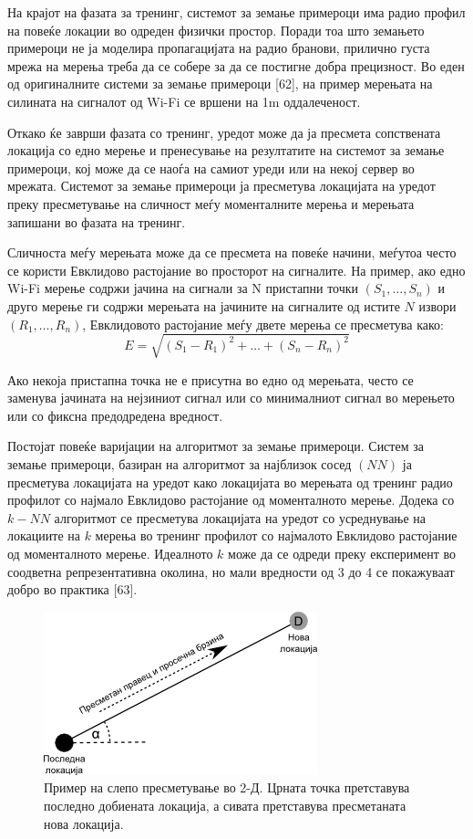 На крајот на фазата за тренинг, системот за земање примероци има радио профил на
повеќе локации во одреден физички простор. Поради тоа што земањето примероци не
ја моделира пропагацијата на радио бранови, прилично густа мрежа на мерења треба
да се собере за да се постигне добра прецизност. Во еден од оригиналните системи
за земање примероци [62], на пример мерењата на силината на сигналот од Wi-Fi се
вршени на 1m оддалеченост. 

Откако ќе заврши фазата со тренинг, уредот може да ја
пресмета сопствената локација со едно мерење и пренесување на резултатите на
системот за земање примероци, кој може да се наоѓа на самиот уреди или на некој
сервер во мрежата. Системот за земање примероци ја пресметува локацијата на
уредот преку пресметување на сличност меѓу моменталните мерења и мерењата
запишани во фазата на тренинг. 

Сличноста меѓу мерењата може да се пресмета на
повеќе начини, меѓутоа често се користи Евклидово растојание во просторот на
сигналите. На пример, ако едно Wi-Fi мерење содржи јачина на сигнали за N
пристапни точки $(S_1, \ldots ,S_n)$ и друго мерење ги содржи мерењата на
јачините на сигналите од истите $N$ извори $(R_1, \ldots ,R_n)$, Евклидовото
растојание меѓу двете мерења се пресметува како:\\
\[
    E = \sqrt{(S_1 - R_1)^2 + \ldots + (S_n - R_n)^2}
\] 

Ако некоја
пристапна точка не е присутна во едно од мерењата, често се заменува јачината на
нејзиниот сигнал или со минималниот сигнал во мерењето или со фиксна
предодредена вредност. 

Постојат повеќе варијации на алгоритмот за земање
примероци. Систем за земање примероци, базиран на алгоритмот за најблизок сосед
$(NN)$ ја пресметува локацијата на уредот како локацијата во мерењата од тренинг
радио профилот со најмало Евклидово растојание од моменталното мерење. Додека со
$k-NN$ алгоритмот се пресметува локацијата на уредот со усреднување на локациите
на $k$ мерења во тренинг профилот со најмалото Евклидово растојание од
моменталното мерење. Идеалното $k$ може да се одреди преку експеримент во
соодветна репрезентативна околина, но мали вредности од 3 до 4 се покажуваат
добро во практика [63].
 
\begin{figure}[htb]
\centering
\includegraphics[scale=0.4]{images/dead_reconing}
\caption{Пример на слепо пресметување во 2-Д. Црната точка претставува последно
добиената локација, а сивата претставува пресметаната нова локација.}
\label{fig:dead_reconing}
\end{figure}
 

